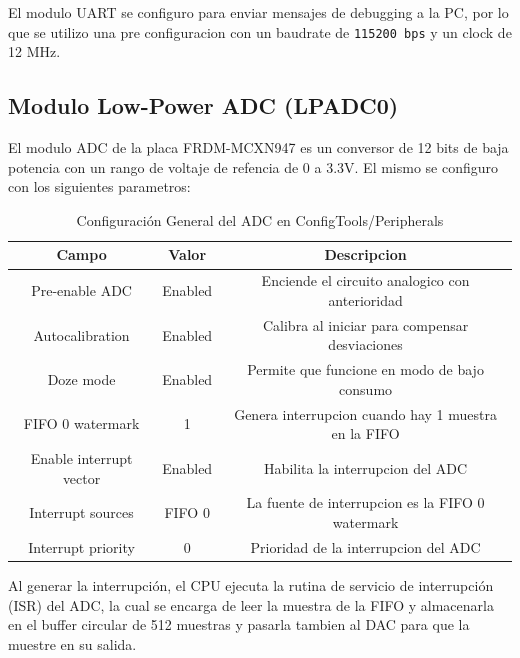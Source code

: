 \documentclass[11pt,a4paper]{article}
\begin{document}
El modulo UART se configuro para enviar mensajes de debugging a la PC, por lo
que se utilizo una pre configuracion con un baudrate de \texttt{115200 bps} y
un clock de 12 MHz.

\subsection{Modulo Low-Power ADC (LPADC0)}

El modulo ADC de la placa FRDM-MCXN947 es un conversor de 12 bits de baja
potencia con un rango de voltaje de refencia de 0 a 3.3V. El mismo se configuro
con los siguientes parametros:

\begin{table}[H]
    \centering
    \begin{tabular}{|c|c|c|}
        \hline
        \textbf{Campo}          & \textbf{Valor} & \textbf{Descripcion}                                \\
        \hline
        Pre-enable ADC          & Enabled        & Enciende el circuito analogico con anterioridad     \\
        Autocalibration         & Enabled        & Calibra al iniciar para compensar desviaciones      \\
        Doze mode               & Enabled        & Permite que funcione en modo de bajo consumo        \\
        FIFO 0 watermark        & 1              & Genera interrupcion cuando hay 1 muestra en la FIFO \\
        Enable interrupt vector & Enabled        & Habilita la interrupcion del ADC                    \\
        Interrupt sources       & FIFO 0         & La fuente de interrupcion es la FIFO 0 watermark    \\
        Interrupt priority      & 0              & Prioridad de la interrupcion del ADC                \\
        \hline
    \end{tabular}
    \caption{Configuración General del ADC en ConfigTools/Peripherals}
\end{table}

Al generar la interrupción, el CPU ejecuta la rutina de servicio de
interrupción (ISR) del ADC, la cual se encarga de leer la muestra de la FIFO y
almacenarla en el buffer circular de 512 muestras y pasarla tambien al DAC para
que la muestre en su salida.
\end{document}

